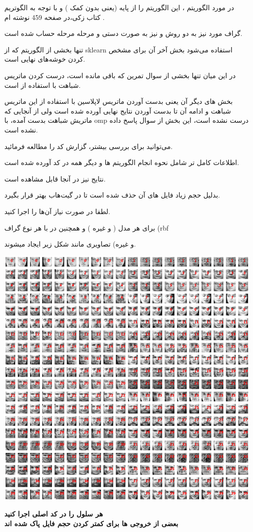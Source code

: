 \documentclass[a4paper, 12pt]{article}
\begin{document}
	
	در مورد الگوریتم
	، این الگوریتم را از پایه (یعنی بدون کمک 
	)
	و با توجه به الگوتریم کتاب زکی،در صفحه 459 نوشته ام
	.
	
	گراف مورد نیز به دو روش 
	و 
	نیز به صورت دستی و مرحله مرحله حساب شده است. 
	
	تنها بخشی از الگوریتم 
	که از sklearn
	استفاده می‌شود بخش آخر آن برای مشخص کردن خوشه‌های نهایی است. 
	
	در این میان تنها بخشی از سوال تمرین که باقی مانده است، درست کردن ماتریس شباهت با استفاده از 
	است.
	
	بخش های دیگر آن یعنی بدست آوردن ماتریس لاپلاسین با استفاده از این ماتریس شباهت و ادامه آن تا بدست آوردن نتایج نهایی آورده شده است ولی از آنجایی که ماتریش شباهت بدست آمده، با 
	omp 
	درست نشده است، این بخش از سوال پاسخ داده نشده است. 
	
	می‌توانید برای بررسی بیشتر، گزارش کد را مطالعه فرمائید.
	
	اطلاعات کامل تر شامل نحوه انجام الگوریتم ها و دیگر همه در کد آورده شده است.
	
	نتایج نیز در آنجا قابل مشاهده است.
	
	
	بدلیل حجم زیاد فایل 
	های آن حذف شده است تا در گیت‌هاب بهتر قرار بگیرد. 
	
	لطفا در صورت نیاز آن‌ها را اجرا کنید. 
	
	برای هر مدل (
	و غیره
	)
	و همچنین در 
	با هر نوع گراف 
	(rbf 
	
	و غیره)
	تصاویری مانند شکل زیر 
	ایجاد میشوند. 	
	
	\begin{center}
		\includegraphics[scale=0.5]{fig1.png}
	\end{center}

\textbf{هر سلول را در کد اصلی اجرا کنید}\\
\textbf{بعضی از خروجی ها برای کمتر کردن حجم فایل پاک شده اند}
\end{document}
